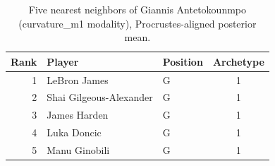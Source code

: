 \begin{table}[htbp]
  \centering\small
  \begin{tabular}{rllc}
    \toprule
    Rank & Player & Position & Archetype \\
    \midrule
    1 & LeBron James & G & 1 \\
    2 & Shai Gilgeous-Alexander & G & 1 \\
    3 & James Harden & G & 1 \\
    4 & Luka Doncic & G & 1 \\
    5 & Manu Ginobili & G & 1 \\
    \bottomrule
  \end{tabular}
  \caption{Five nearest neighbors of Giannis Antetokounmpo (curvature_m1 modality), Procrustes-aligned posterior mean.}
  \label{tab:Giannis_Antetokounmpo_neighbors_curvature_m1}
\end{table}

